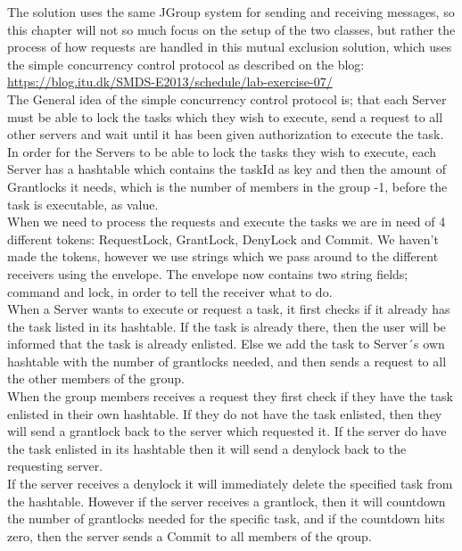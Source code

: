 The solution uses the same JGroup system for sending and receiving messages, so this chapter will not so much focus on the setup of the two classes, but rather the process of how requests are handled in this mutual exclusion solution, which uses the simple concurrency control protocol as described on the blog: \url{https://blog.itu.dk/SMDS-E2013/schedule/lab-exercise-07/} \\

The General idea of the simple concurrency control protocol is; that each Server must be able to lock the tasks which they wish to execute, send a request to all other servers and wait until it has been given authorization to execute the task. \\

In order for the Servers to be able to lock the tasks they wish to execute, each Server has a hashtable which contains the taskId as key and then the amount of Grantlocks it needs, which is the number of members in the group -1, before the task is executable, as value. \\

When we need to process the requests and execute the tasks we are in need of 4 different tokens: RequestLock, GrantLock, DenyLock and Commit. We haven’t made the tokens, however we use strings which we pass around to the different receivers using the envelope. The envelope now contains two string fields; command and lock, in order to tell the receiver what to do. \\

When a Server wants to execute or request a task, it first checks if it already has the task listed in its hashtable. If the task is already there, then the user will be informed that the task is already enlisted. Else we add the task to Server´s own hashtable with the number of grantlocks needed, and then sends a request to all the other members of the group. \\

When the group members receives a request they first check if they have the task enlisted in their own hashtable. If they do not have the task enlisted, then they will send a grantlock back to the server which requested it. If the server do have the task enlisted in its hashtable then it will send a denylock back to the requesting server. \\

If the server receives a denylock it will immediately delete the specified task from the hashtable. However if the server receives a grantlock, then it will countdown the number of grantlocks needed for the specific task, and if the countdown hits zero, then the server sends a Commit to all members of the qroup. \\

